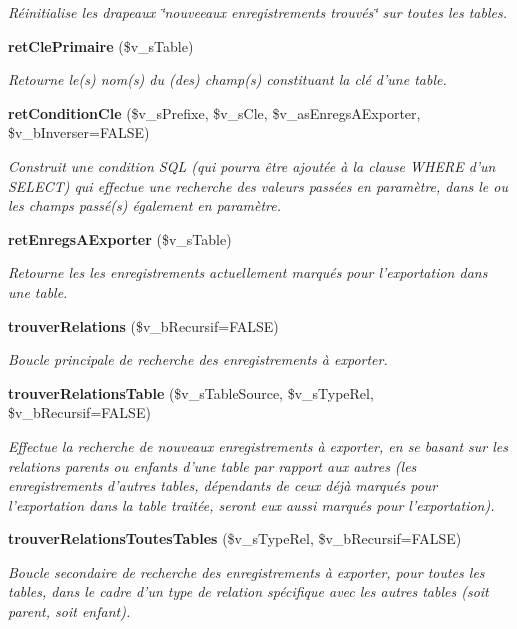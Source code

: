 \begin{CompactItemize}
\begin{CompactList}\small\item\em Réinitialise les drapeaux \char`\"{}nouveeaux enregistrements trouvés\char`\"{} sur toutes les tables. \item\end{CompactList}\item 
{\bf retClePrimaire} (\$v\_\-sTable)
\begin{CompactList}\small\item\em Retourne le(s) nom(s) du (des) champ(s) constituant la clé d'une table. \item\end{CompactList}\item 
{\bf retConditionCle} (\$v\_\-sPrefixe, \$v\_\-sCle, \$v\_\-asEnregsAExporter, \$v\_\-bInverser=FALSE)
\begin{CompactList}\small\item\em Construit une condition SQL (qui pourra être ajoutée à la clause WHERE d'un SELECT) qui effectue une recherche des valeurs passées en paramètre, dans le ou les champs passé(s) également en paramètre. \item\end{CompactList}\item 
{\bf retEnregsAExporter} (\$v\_\-sTable)
\begin{CompactList}\small\item\em Retourne les les enregistrements actuellement marqués pour l'exportation dans une table. \item\end{CompactList}\item 
{\bf trouverRelations} (\$v\_\-bRecursif=FALSE)
\begin{CompactList}\small\item\em Boucle principale de recherche des enregistrements à exporter. \item\end{CompactList}\item 
{\bf trouverRelationsTable} (\$v\_\-sTableSource, \$v\_\-sTypeRel, \$v\_\-bRecursif=FALSE)
\begin{CompactList}\small\item\em Effectue la recherche de nouveaux enregistrements à exporter, en se basant sur les relations parents ou enfants d'une table par rapport aux autres (les enregistrements d'autres tables, dépendants de ceux déjà marqués pour l'exportation dans la table traitée, seront eux aussi marqués pour l'exportation). \item\end{CompactList}\item 
{\bf trouverRelationsToutesTables} (\$v\_\-sTypeRel, \$v\_\-bRecursif=FALSE)
\begin{CompactList}\small\item\em Boucle secondaire de recherche des enregistrements à exporter, pour toutes les tables, dans le cadre d'un type de relation spécifique avec les autres tables (soit parent, soit enfant). \item\end{CompactList}\end{CompactItemize}
